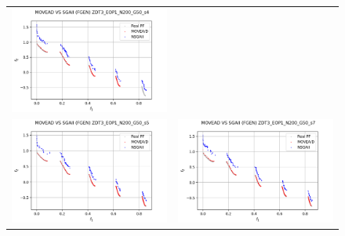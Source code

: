 \begin{figure}[H]
\begin{tabular}{c c}
    \includegraphics[scale=0.5]{figures/ZDT3_EOP1_N200_G50_T30/s4_comp.png}\\
    \includegraphics[scale=0.5]{figures/ZDT3_EOP1_N200_G50_T30/s5_comp.png} &
    \includegraphics[scale=0.5]{figures/ZDT3_EOP1_N200_G50_T30/s7_comp.png}\\

\end{tabular}
\end{figure}
